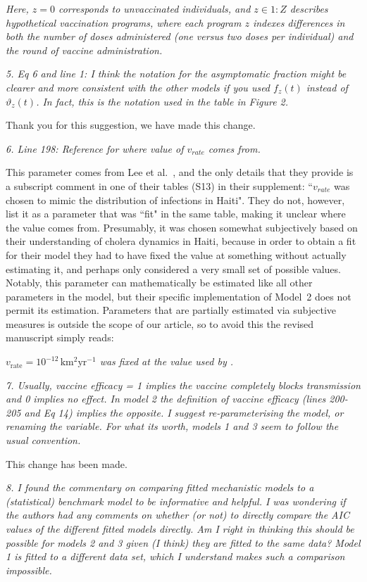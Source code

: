 \documentclass[11pt]{article}
\newcommand\seq[2]{{#1}\!:\!{#2}}
\newcommand\vaccClass{Z}
\newcommand\vaccCounter{z}
\newcommand\report[1]{{\color{mygreen} \vspace{1mm}\hspace{0.25in}\parbox{6in}{\em #1}}}
\newcommand\article[1]{{\color{blue} \vspace{1mm}\hspace{0.25in}\parbox{6in}{\em #1}}}
\begin{document}
\article{Here, $\vaccCounter=0$ corresponds to unvaccinated individuals, and $\vaccCounter \in \seq{1}{\vaccClass}$ describes hypothetical vaccination programs, where each program $\vaccCounter$ indexes differences in both the number of doses administered (one versus two doses per individual) and the round of vaccine administration.}

\report{5.
  Eq 6 and line 1: I think the notation for the asymptomatic fraction might be clearer and more consistent with the other models if you used $f_z(t)$ instead of $\vartheta_z(t)$. In fact, this is the notation used in the table in Figure 2.
}

Thank you for this suggestion, we have made this change.

\report{6.
  Line 198: Reference for where value of $v_{rate}$ comes from.
}

This parameter comes from Lee et al.~\cite{lee20}, and the only details that they provide is a subscript comment in one of their tables (S13) in their supplement: ``$v_{rate}$ was chosen to mimic the distribution of infections in Haiti".
They do not, however, list it as a parameter that was ``fit" in the same table, making it unclear where the value comes from.
Presumably, it was chosen somewhat subjectively based on their understanding of cholera dynamics in Haiti, because in order to obtain a fit for their model they had to have fixed the value at something without actually estimating it, and perhaps only considered a very small set of possible values. Notably, this parameter can mathematically be estimated like all other parameters in the model, but their specific implementation of Model~2 does not permit its estimation.
Parameters that are partially estimated via subjective measures is outside the scope of our article, so to avoid this the revised manuscript simply reads:

\article{$v_{\mathrm{rate}}= 10^{-12} \,\mbox{km$^2$yr$^{-1}$}$ was fixed at the value used by \cite{lee20}.}

\report{7.
  Usually, vaccine efficacy = 1 implies the vaccine completely blocks transmission and 0 implies no effect. In model 2 the definition of vaccine efficacy (lines 200-205 and Eq 14) implies the opposite. I suggest re-parameterising the model, or renaming the variable. For what its worth, models 1 and 3 seem to follow the usual convention.
}

This change has been made.

\report{8.
  I found the commentary on comparing fitted mechanistic models to a (statistical) benchmark model to be informative and helpful. I was wondering if the authors had any comments on whether (or not) to directly compare the AIC values of the different fitted models directly. Am I right in thinking this should be possible for models 2 and 3 given (I think) they are fitted to the same data? Model 1 is fitted to a different data set, which I understand makes such a comparison impossible.
}
\end{document}
